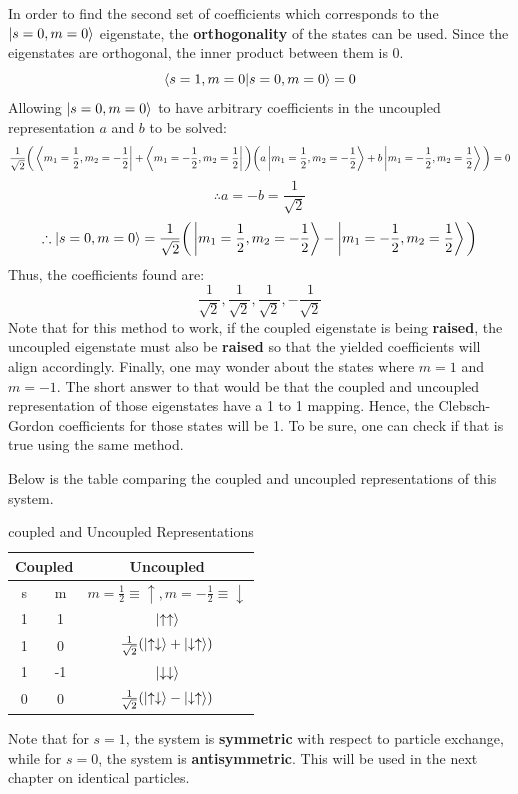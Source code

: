 \documentclass{article}
\begin{document}
\begin{flushleft}
In order to find the second set of coefficients which corresponds to the $\ket{s=0,m=0}$ eigenstate, the \textbf{orthogonality} of the states can be used. Since the eigenstates are orthogonal, the inner product between them is $0$.
$$\braket{s=1,m=0}{s=0,m=0}=0$$
Allowing $\ket{s=0,m=0}$ to have arbitrary coefficients in the uncoupled representation $a$ and $b$ to be solved:
$$\frac{1}{\sqrt{2}}\bigg(\bra{m_1=\frac{1}{2},m_2=-\frac{1}{2}}+\bra{m_1=-\frac{1}{2},m_2=\frac{1}{2}}\bigg)\bigg(a\ket{m_1=\frac{1}{2},m_2=-\frac{1}{2}}+b\ket{m_1=-\frac{1}{2},m_2=\frac{1}{2}}\bigg)=0$$
$$\therefore a=-b=\frac{1}{\sqrt{2}}$$
$$\therefore \ket{s=0,m=0}=\frac{1}{\sqrt{2}}\bigg(\ket{m_1=\frac{1}{2},m_2=-\frac{1}{2}}-\ket{m_1=-\frac{1}{2},m_2=\frac{1}{2}}\bigg)$$
Thus, the coefficients found are:
$$\frac{1}{\sqrt{2}},\frac{1}{\sqrt{2}},\frac{1}{\sqrt{2}},-\frac{1}{\sqrt{2}}$$
Note that for this method to work, if the coupled eigenstate is being \textbf{raised}, the uncoupled eigenstate must also be \textbf{raised} so that the yielded coefficients will align accordingly. Finally, one may wonder about the states where $m=1$ and $m=-1$. The short answer to that would be that the coupled and uncoupled representation of those eigenstates have a 1 to 1 mapping. Hence, the Clebsch-Gordon coefficients for those states will be 1. To be sure, one can check if that is true using the same method. 

Below is the table comparing the coupled and uncoupled representations of this system.


\begin{table}[h]
        \centering
    \begin{tabular}{|c|c|c|}
    \hline
        \multicolumn{2}{|c|}{Coupled} &Uncoupled \\
        \hline
         s&  m& $m=\frac{1}{2}\equiv\uparrow,m=-\frac{1}{2}\equiv\downarrow$\\
         \hline
         1&  1& $\ket{\uparrow\uparrow}$\\
         \hline
         1&  0& $\frac{1}{\sqrt{2}}(\ket{\uparrow\downarrow}+\ket{\downarrow\uparrow})$\\
         \hline
         1&  -1& $\ket{\downarrow\downarrow}$\\
         \hline
         0&  0& $\frac{1}{\sqrt{2}}(\ket{\uparrow\downarrow}-\ket{\downarrow\uparrow})$\\
         \hline
    \end{tabular}
    \caption{coupled and Uncoupled Representations}
    \label{tab:my_label}
\end{table}
Note that for $s=1$, the system is \textbf{symmetric} with respect to particle exchange, while for $s=0$, the system is \textbf{antisymmetric}. This will be used in the next chapter on identical particles.\\[0.5cm]


\end{flushleft}
\end{document}
